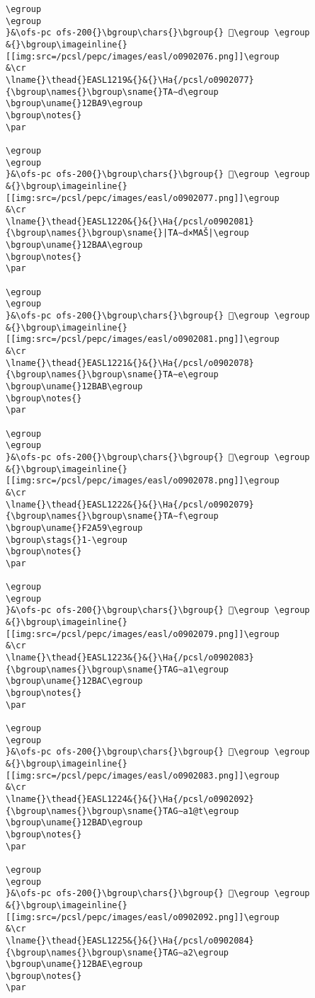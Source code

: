 \begin{verbatim}
\egroup
\egroup
}&\ofs-pc ofs-200{}\bgroup\chars{}\bgroup{} 𒮨\egroup \egroup
&{}\bgroup\imageinline{}[[img:src=/pcsl/pepc/images/easl/o0902076.png]]\egroup
&\cr
\lname{}\thead{}EASL1219&{}&{}\Ha{/pcsl/o0902077}{\bgroup\names{}\bgroup\sname{}TA∼d\egroup
\bgroup\uname{}12BA9\egroup
\bgroup\notes{}
\par 

\egroup
\egroup
}&\ofs-pc ofs-200{}\bgroup\chars{}\bgroup{} 𒮩\egroup \egroup
&{}\bgroup\imageinline{}[[img:src=/pcsl/pepc/images/easl/o0902077.png]]\egroup
&\cr
\lname{}\thead{}EASL1220&{}&{}\Ha{/pcsl/o0902081}{\bgroup\names{}\bgroup\sname{}|TA∼d×MAŠ|\egroup
\bgroup\uname{}12BAA\egroup
\bgroup\notes{}
\par 

\egroup
\egroup
}&\ofs-pc ofs-200{}\bgroup\chars{}\bgroup{} 𒮪\egroup \egroup
&{}\bgroup\imageinline{}[[img:src=/pcsl/pepc/images/easl/o0902081.png]]\egroup
&\cr
\lname{}\thead{}EASL1221&{}&{}\Ha{/pcsl/o0902078}{\bgroup\names{}\bgroup\sname{}TA∼e\egroup
\bgroup\uname{}12BAB\egroup
\bgroup\notes{}
\par 

\egroup
\egroup
}&\ofs-pc ofs-200{}\bgroup\chars{}\bgroup{} 𒮫\egroup \egroup
&{}\bgroup\imageinline{}[[img:src=/pcsl/pepc/images/easl/o0902078.png]]\egroup
&\cr
\lname{}\thead{}EASL1222&{}&{}\Ha{/pcsl/o0902079}{\bgroup\names{}\bgroup\sname{}TA∼f\egroup
\bgroup\uname{}F2A59\egroup
\bgroup\stags{}1-\egroup
\bgroup\notes{}
\par 

\egroup
\egroup
}&\ofs-pc ofs-200{}\bgroup\chars{}\bgroup{} 󲩙\egroup \egroup
&{}\bgroup\imageinline{}[[img:src=/pcsl/pepc/images/easl/o0902079.png]]\egroup
&\cr
\lname{}\thead{}EASL1223&{}&{}\Ha{/pcsl/o0902083}{\bgroup\names{}\bgroup\sname{}TAG∼a1\egroup
\bgroup\uname{}12BAC\egroup
\bgroup\notes{}
\par 

\egroup
\egroup
}&\ofs-pc ofs-200{}\bgroup\chars{}\bgroup{} 𒮬\egroup \egroup
&{}\bgroup\imageinline{}[[img:src=/pcsl/pepc/images/easl/o0902083.png]]\egroup
&\cr
\lname{}\thead{}EASL1224&{}&{}\Ha{/pcsl/o0902092}{\bgroup\names{}\bgroup\sname{}TAG∼a1@t\egroup
\bgroup\uname{}12BAD\egroup
\bgroup\notes{}
\par 

\egroup
\egroup
}&\ofs-pc ofs-200{}\bgroup\chars{}\bgroup{} 𒮭\egroup \egroup
&{}\bgroup\imageinline{}[[img:src=/pcsl/pepc/images/easl/o0902092.png]]\egroup
&\cr
\lname{}\thead{}EASL1225&{}&{}\Ha{/pcsl/o0902084}{\bgroup\names{}\bgroup\sname{}TAG∼a2\egroup
\bgroup\uname{}12BAE\egroup
\bgroup\notes{}
\par 


\end{verbatim}
